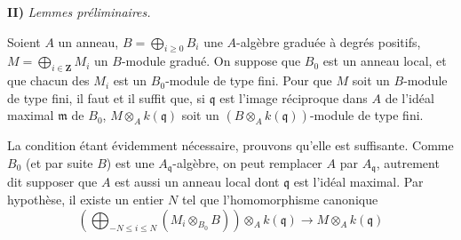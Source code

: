 \medskip
\noindent\textbf{II)} \emph{Lemmes préliminaires.}

\begin{lemma}[11.2.9.3]
\label{IV.11.2.9.3-fr}
Soient $A$ un anneau,
$B=\bigoplus_{i\geq0}B_i$ une $A$-algèbre graduée à degrés positifs,
$M=\bigoplus_{i\in\mathbf Z}M_i$ un $B$-module gradué. On suppose que $B_0$
est un anneau local, et que chacun des $M_i$ est un $B_0$-module de type fini.
Pour que $M$ soit un $B$-module de type fini, il faut et il suffit que, si
$\mathfrak q$ est l'image réciproque dans $A$ de l'idéal maximal $\mathfrak m$
de $B_0$, $M\otimes_Ak(\mathfrak q)$ soit un
$(B\otimes_Ak(\mathfrak q))$-module de type fini.
\end{lemma}

La condition étant évidemment nécessaire, prouvons qu'elle est suffisante.
Comme $B_0$ (et par suite $B$) est une $A_{\mathfrak q}$-algèbre, on peut
remplacer $A$ par $A_{\mathfrak q}$, autrement dit supposer que $A$ est aussi
un anneau local dont $\mathfrak q$ est l'idéal maximal. Par hypothèse, il existe
un entier $N$ tel que l'homomorphisme canonique
\[
\left(\bigoplus_{-N\leq i\leq N}(M_i\otimes_{B_0}B)\right)
\otimes_Ak(\mathfrak q)\longrightarrow M\otimes_Ak(\mathfrak q)
\]

